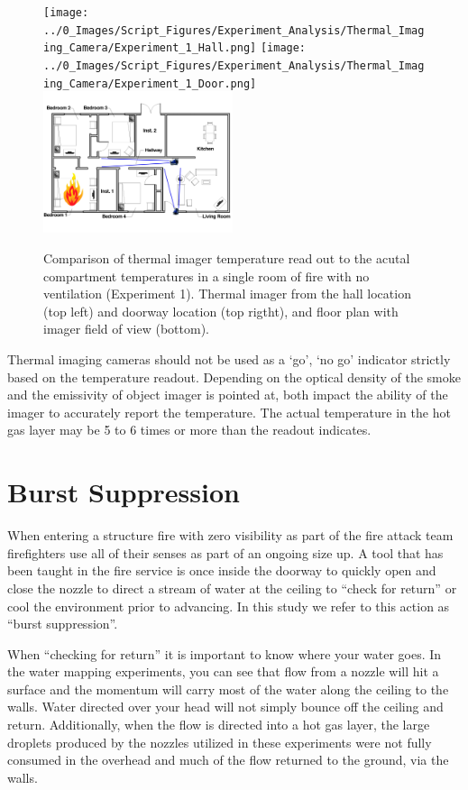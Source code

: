 \documentclass[12pt,oneside]{book}
\begin{document}
\begin{figure}[H]
\centering
\texttt{[image: ../0\_Images/Script\_Figures/Experiment\_Analysis/Thermal\_Imaging\_Camera/Experiment\_1\_Hall.png]}
\texttt{[image: ../0\_Images/Script\_Figures/Experiment\_Analysis/Thermal\_Imaging\_Camera/Experiment\_1\_Door.png]}
\includegraphics[width=0.495\textwidth]{../0_Images/Tactical_Considerations/Thermal_Imager/Imager_Location.png}
\caption[Thermal Imager Example]{Comparison of thermal imager temperature read out to the acutal compartment temperatures in a single room of fire with no ventilation (Experiment 1). Thermal imager from the hall location (top left) and doorway location (top rigtht), and floor plan with imager field of view (bottom).}
\label{fig:thermal_imager_g}
\end{figure}

Thermal imaging cameras should not be used as a `go', `no go' indicator strictly based on the temperature readout. Depending on the optical density of the smoke and the emissivity of object imager is pointed at, both impact the ability of the imager to accurately report the temperature. The actual temperature in the hot gas layer may be 5 to 6 times or more than the readout indicates. 

\section{Burst Suppression} \label{tc:burst_suppression}
When entering a structure fire with zero visibility as part of the fire attack team firefighters use all of their senses as part of an ongoing size up.  A tool that has been taught in the fire service is once inside the doorway to quickly open and close the nozzle to direct a stream of water at the ceiling to ``check for return'' or cool the environment prior to advancing.   In this study we refer to this action as ``burst suppression''.   

When ``checking for return'' it is important to know where your water goes.  In the water mapping experiments, you can see that flow from a nozzle will hit a surface and the momentum will carry most of the water along the ceiling to the walls.  Water directed over your head will not simply bounce off the ceiling and return.  Additionally, when the flow is directed into a hot gas layer, the large droplets produced by the nozzles utilized in these experiments were not fully consumed in the overhead and much of the flow returned to the ground, via the walls.  
\end{document}
